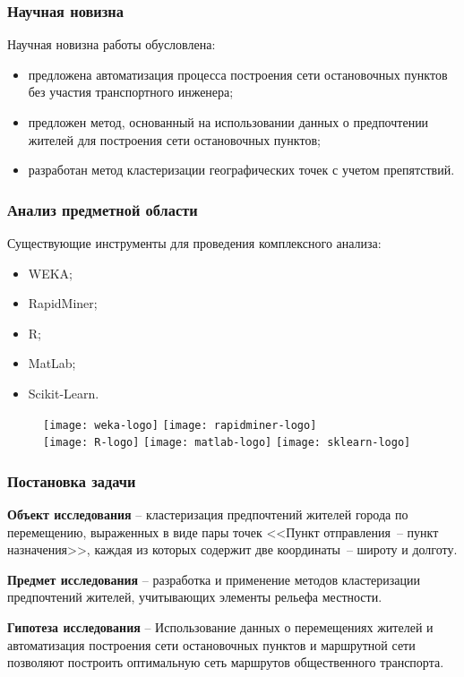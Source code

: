 \begin{frame}
    \frametitle{Научная новизна}
    Научная новизна работы обусловлена:
    \begin{itemize}
        \item предложена автоматизация процесса построения сети остановочных пунктов без участия транспортного инженера;
        \item предложен метод, основанный на использовании данных о предпочтении жителей для построения сети остановочных пунктов;
        \item разработан метод кластеризации географических точек с учетом препятствий.
    \end{itemize}
\end{frame}

\begin{frame}
    \frametitle{Анализ предметной области}
    Существующие инструменты для проведения комплексного анализа:
    \begin{itemize}
        \item WEKA;
        \item RapidMiner;
        \item R;
        \item MatLab;
        \item Scikit-Learn.
    \end{itemize}
    \begin{figure}
        \centering
        \texttt{[image: weka-logo]}\quad
        \texttt{[image: rapidminer-logo]}\\
        \texttt{[image: R-logo]}\quad
        \texttt{[image: matlab-logo]}\quad
        \texttt{[image: sklearn-logo]}
    \end{figure}
\end{frame}

\begin{frame}
    \frametitle{Постановка задачи}
    \textbf{Объект исследования} -- кластеризация предпочтений жителей города по перемещению, выраженных в виде пары точек <<Пункт отправления~-- пункт назначения>>, каждая из которых содержит две координаты~-- широту и долготу.\\\vspace{1em}

    \textbf{Предмет исследования} -- разработка и применение методов кластеризации предпочтений жителей, учитывающих элементы рельефа местности.\\\vspace{1em}

    \textbf{Гипотеза исследования} -- Использование данных о перемещениях жителей и автоматизация построения сети остановочных пунктов и маршрутной сети позволяют построить оптимальную сеть маршрутов общественного транспорта.
\end{frame}

